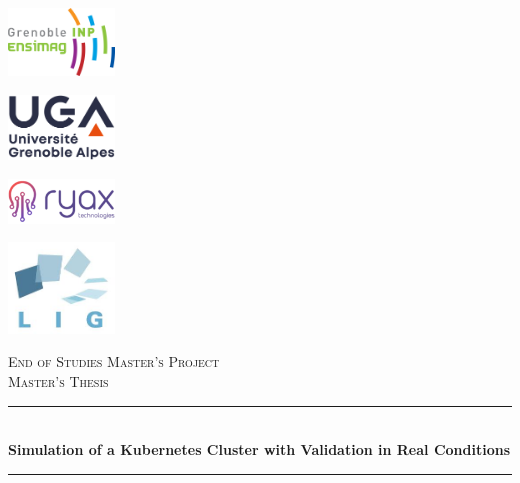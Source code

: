 \documentclass[12pt]{report}
\begin{document}
\begin{titlepage}
    \newcommand{\HRule}{\rule{\linewidth}{0.5mm}} %

    \centering
    \begin{minipage}{.25\textwidth}
	    \centering
	    \includegraphics[width=80pt]{imgs/ENSIMAG.png}\\[1cm]
    \end{minipage}%
    \begin{minipage}{.25\textwidth}
	    \centering
	    \includegraphics[width=80pt]{imgs/uga-logo.png}\\[1cm]
    \end{minipage}%
    \begin{minipage}{.25\textwidth}
	    \centering
	    \includegraphics[width=80pt]{imgs/ryax-logo.png}\\[1cm]
    \end{minipage}%
    \begin{minipage}{.25\textwidth}
	    \centering
	    \includegraphics[width=80pt]{imgs/logo-LIG.jpg}\\[1cm]
    \end{minipage}

    \vspace{4cm}
    \textsc{\Large End of Studies Master's Project}\\[0.5cm]
    \textsc{\large Master's Thesis}\\[0.5cm]

    \HRule \\[0.4cm]
    { \huge \bfseries Simulation of a Kubernetes Cluster with Validation in Real Conditions}\\[0.4cm]
    \HRule \\[3cm]


\end{titlepage}
\end{document}
